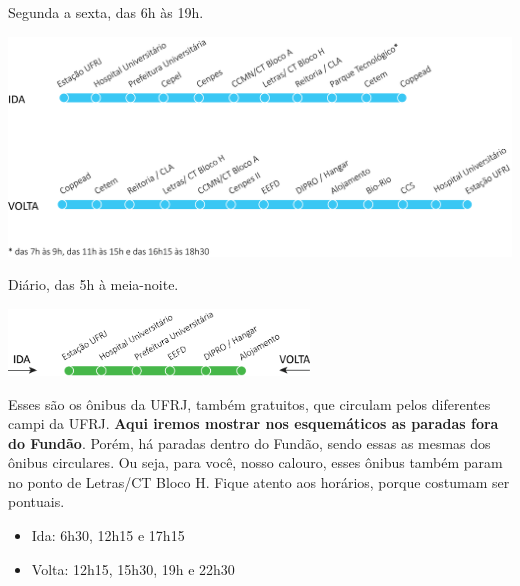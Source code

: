          \pagebreak
              
        
        Segunda a sexta, das 6h às 19h.
        
        \begin{center}
          \includegraphics[width=\textwidth]{assets/esquematico_circular2_ufrj.png}
    	\end{center}       
        
        
        
        Diário, das 5h à meia-noite.
        
        \begin{center}
          \includegraphics[width=0.6\textwidth]{assets/esquematico_circular3_ufrj.png}
    	\end{center}                               

	
    Esses são os ônibus da UFRJ, também gratuitos, que circulam pelos diferentes campi da UFRJ. \textbf{Aqui iremos mostrar nos esquemáticos as paradas fora do Fundão}. Porém, há paradas dentro do Fundão, sendo essas as mesmas dos ônibus circulares. Ou seja, para você, nosso calouro, esses ônibus também param no ponto de Letras/CT Bloco H. Fique atento aos horários, porque costumam ser pontuais.
        \begin{itemize}
          \item [] Ida: 6h30, 12h15 e 17h15
          \item [] Volta: 12h15, 15h30, 19h e 22h30        
    	\end{itemize}
    
